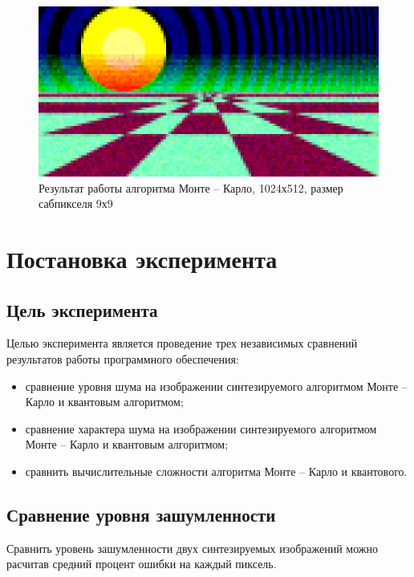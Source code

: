 \begin{figure}[H]
	\begin{center}
		\includegraphics[scale=0.48]{img/prog_res/monte-carlo-1024.png}
	\end{center}
	\captionsetup{justification=centering}
	\caption{Результат работы алгоритма Монте -- Карло, 1024х512, размер сабпикселя 9х9}
	\label{img:example_03-mc}
\end{figure}

\section{Постановка эксперимента} 

\subsection{Цель эксперимента}

Целью эксперимента является проведение трех независимых сравнений результатов работы программного обеспечения:

\begin{itemize}
	\item сравнение уровня шума на изображении синтезируемого алгоритмом Монте -- Карло и квантовым алгоритмом;
	\item сравнение характера шума на изображении синтезируемого алгоритмом Монте -- Карло и квантовым алгоритмом;
	\item сравнить вычислительные сложности алгоритма Монте -- Карло и квантового.
\end{itemize}

\subsection{Сравнение уровня зашумленности}

Сравнить уровень зашумленности двух синтезируемых изображений можно расчитав средний процент ошибки на каждый пиксель.

